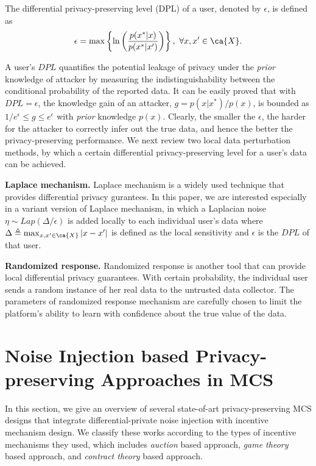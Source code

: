 \begin{df}\label{def1}
The differential privacy-preserving level (DPL) of a user, denoted by $\epsilon$, is defined as
\begin{equation}
\epsilon = \max\left\{\ln\left(\frac{p(x^*|x)}{p(x^*|x')}\right)\right\}, ~\forall x, x'\in\ca{X}.
\end{equation}
\end{df}
A user's $DPL$ quantifies the potential leakage of privacy under the \emph{prior} knowledge of attacker by measuring the indistinguishability between the conditional probability of the reported data. It can be easily proved that with $DPL=\epsilon$, the knowledge gain of an attacker, $g=p(x|x^*)/p(x)$, is bounded as $1/e^\epsilon\leq g\leq e^\epsilon$ with \emph{prior} knowledge $p(x)$. Clearly, the smaller the $\epsilon$, the harder for the attacker to correctly infer out the true data, and hence the better the privacy-preserving performance. We next review two local data perturbation methods, by which a certain differential privacy-preserving level for a user's data can be achieved.

\textbf{Laplace mechanism.}
Laplace mechanism is a widely used technique that provides differential privacy gurantees\cite{dwork2014algorithmic}. In this paper, we are interested especially in a variant version of Laplace mechanism, in which a Laplacian noise $\eta\sim Lap(\Delta/\epsilon)$ is added locally to each individual user's data where $\Delta \triangleq \max_{x,x'\in\ca{X}}|x-x'|$ is defined as the local sensitivity and $\epsilon$ is the $DPL$ of that user.  

\textbf{Randomized response.}
Randomized response is another tool that can provide local differential privacy guarantees\cite{dwork2014algorithmic}. With certain probability, the individual user sends a random instance of her real data to the untrusted data collector. The parameters of randomized response mechanism are carefully chosen to limit the platform's ability to learn with confidence about the true value of the data. %

\section{Noise Injection based Privacy-preserving Approaches in MCS}\label{sec:s3}
In this section, we give an overview of several state-of-art privacy-preserving MCS designs that integrate differential-private noise injection with incentive mechanism design. We classify these works according to the types of incentive mechanisms they used, which includes \emph{auction} based approach, \emph{game theory} based approach, and \emph{contract theory} based approach.



